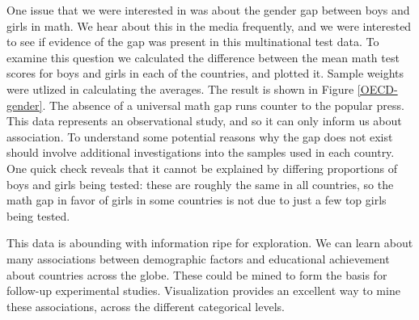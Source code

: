 \documentclass{article}
\begin{document}
One issue that we were interested in was about the gender gap between boys and girls in math. We hear about this in the media frequently, and we were interested to see if evidence of the gap was present in this multinational test data. To examine this question we calculated the difference between the mean math test scores for boys and girls in each of the countries, and plotted it. Sample weights were utlized in calculating the averages. The result is shown in Figure \ref{OECD-gender}. The absence of a universal math gap runs counter to the popular press. This data represents an observational study, and so it can only inform us about association. To understand some potential reasons why the gap does not exist should involve additional investigations into the samples used in each country. One quick check reveals that it cannot be explained by differing proportions of boys and girls being tested: these are roughly the same in all countries, so the math gap in favor of girls in some countries is not due to just a few top girls being tested. 

This data is abounding with information ripe for exploration. We can learn about many associations between demographic factors and educational achievement about countries across the globe. These could be mined to form the basis for follow-up experimental studies. Visualization provides an excellent way to mine these associations, across the different categorical levels.
\end{document}
